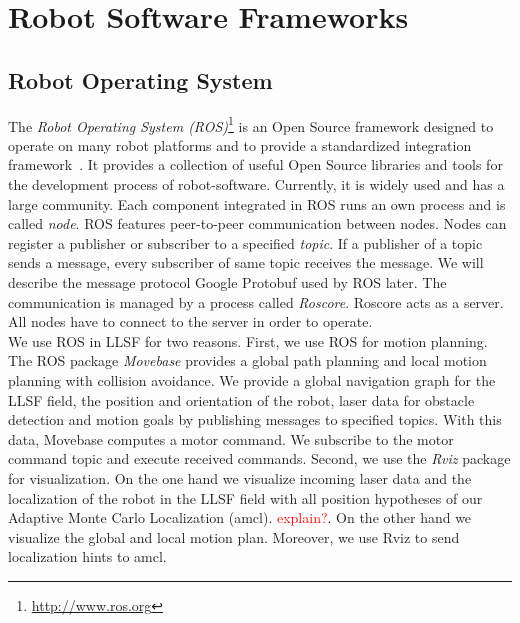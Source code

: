 \section{Robot Software Frameworks}
\label{sec:robot_software_frameworks}
\subsection{Robot Operating System}
The \textit{Robot Operating System (ROS)}\footnote{\url{http://www.ros.org}} is an Open Source framework designed to operate on many robot platforms and to provide a standardized integration framework~\cite{Ros}. It provides a collection of useful Open Source libraries and tools for the development process of robot-software. Currently, it is widely used and has a large community. Each component integrated in ROS runs an own process and is called \textit{node}. ROS features peer-to-peer communication between nodes. Nodes can register a publisher or subscriber to a specified \textit{topic}. If a publisher of a topic sends a message, every subscriber of same topic receives the message. We will describe the message protocol Google Protobuf used by ROS later. The communication is managed by a process called \textit{Roscore}. Roscore acts as a server. All nodes have to connect to the server in order to operate.\\
We use ROS in LLSF for two reasons. First, we use ROS for motion planning. The ROS package \textit{Movebase} provides a global path planning and local motion planning with collision avoidance. We provide a global navigation graph for the LLSF field, the position and orientation of the robot, laser data for obstacle detection and motion goals by publishing messages to specified topics. With this data, Movebase computes a motor command. We subscribe to the motor command topic and execute received commands. Second, we use the \textit{Rviz} package for visualization. On the one hand we visualize incoming laser data and the localization of the robot in the LLSF field with all position hypotheses of our Adaptive Monte Carlo Localization (amcl). \textcolor{red}{explain?}. On the other hand we visualize the global and local motion plan. Moreover, we use Rviz to send localization hints to amcl.

